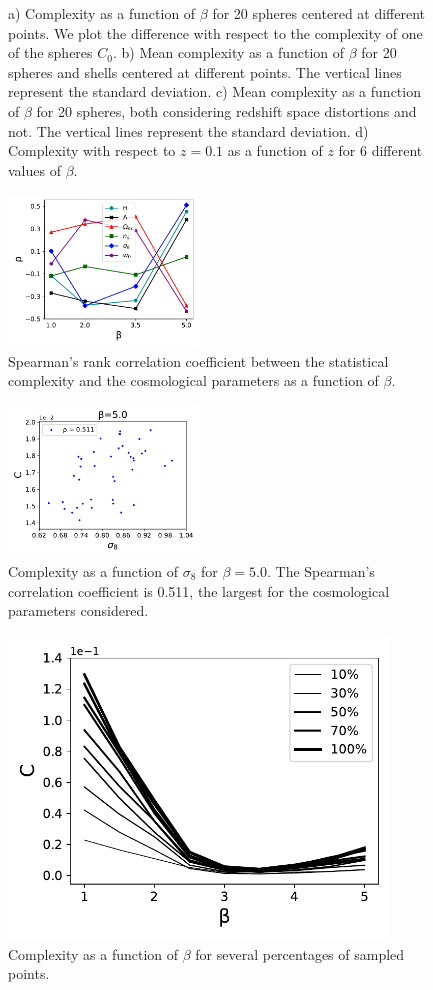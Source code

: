 \documentclass[fleqn,usenatbib]{mnras}
\begin{document}
\begin{figure}
    \caption{a) Complexity as a function of $\beta$ for 20 spheres centered at different points. We plot the difference with respect to the complexity of one of the spheres $C_0$. b) Mean complexity as a function of $\beta$ for 20 spheres and shells centered at different points. The vertical lines represent the standard deviation. c) Mean complexity as a function of $\beta$ for 20 spheres, both considering redshift space distortions and not. The vertical lines represent the standard deviation. d) Complexity with respect to $z=0.1$ as a function of $z$ for 6 different values of $\beta$.}
    \label{fig:4graf}
\end{figure}
\begin{figure}
    \centering
    \includegraphics[width=0.45\textwidth]{rhovb.pdf}
\caption{Spearman's rank correlation coefficient between the statistical complexity and the cosmological parameters as a function of $\beta$.}
    \label{fig:rhovb}
\end{figure}
\begin{figure}
    \centering
    \includegraphics[width=0.45\textwidth]{cvsigma8.pdf}
    \caption{Complexity as a function of $\sigma_{8}$ for $\beta=5.0$. The Spearman's correlation coefficient is 0.511, the largest for the cosmological parameters considered.}
    \label{fig:cvsigma8}
\end{figure}
\begin{figure}
    \centering
    \includegraphics[width=0.9\textwidth]{cvb_porc.pdf}
    \caption{Complexity as a function of $\beta$ for several percentages of sampled points.}
    \label{fig:cvb_porcentaje}
\end{figure}
\end{document}
